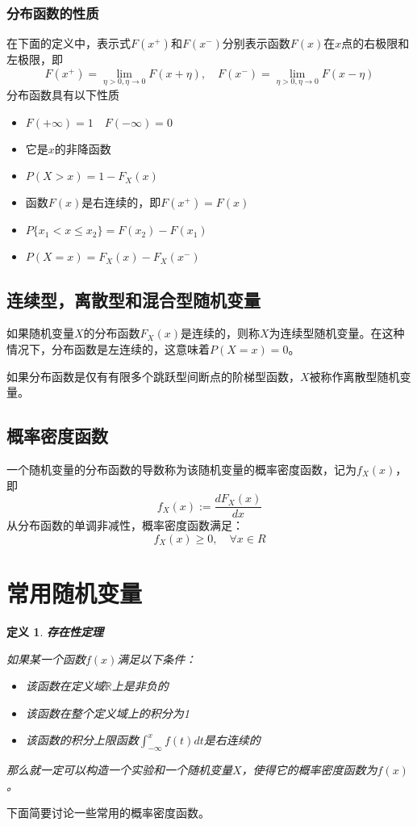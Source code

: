 \documentclass{ctexart}
\newtheorem{Definition}{\hspace{2em}定义}[section]
\begin{document}
            \subsubsection{分布函数的性质}
                在下面的定义中，表示式$F(x^+)$和$F(x^-)$分别表示函数$F(x)$在$x$点的右极限和左极限，即
                $$
                    F(x^+) = \lim_{\eta >0,\eta\rightarrow 0} F(x+\eta),\quad F(x^-)=\lim_{\eta >0,\eta\rightarrow 0} F(x-\eta)
                $$
                分布函数具有以下性质
                \begin{itemize}
                    \item $ F(+\infty) = 1\quad F(-\infty) = 0$
                    \item 它是$x$的非降函数
                    \item $P(X > x)=1-F_X(x)$
                    \item 函数$F(x)$是右连续的，即$F(x^+)=F(x)$
                    \item $P\{x_1<x\le x_2\}=F(x_2)-F(x_1)$
                    \item $P(X=x) = F_X(x) - F_X(x^-)$
                \end{itemize}
            \subsection{连续型，离散型和混合型随机变量}
                如果随机变量$X$的分布函数$F_X(x)$是连续的，则称$X$为连续型随机变量。在这种情况下，分布函数是左连续的，这意味着$P(X=x)=0$。
                
                如果分布函数是仅有有限多个跳跃型间断点的阶梯型函数，$X$被称作离散型随机变量。
            \subsection{概率密度函数}
                一个随机变量的分布函数的导数称为该随机变量的概率密度函数，记为$f_X(x)$，即
                $$
                    f_X(x) := \frac{dF_X(x)}{dx}
                $$
                从分布函数的单调非减性，概率密度函数满足：
                $$
                    f_X(x)\ge 0,\quad \forall x \in R
                $$
        \section{常用随机变量}
            \begin{Definition}
                \textbf{存在性定理} 
                
                如果某一个函数$f(x)$满足以下条件：
                \begin{itemize}
                    \item 该函数在定义域$\mathbb{R}$上是非负的
                    \item 该函数在整个定义域上的积分为1
                    \item 该函数的积分上限函数$\int_{-\infty}^{x}f(t)dt$是右连续的
                \end{itemize}
                那么就一定可以构造一个实验和一个随机变量$X$，使得它的概率密度函数为$f(x)$。
            \end{Definition}
            下面简要讨论一些常用的概率密度函数。
\end{document}
